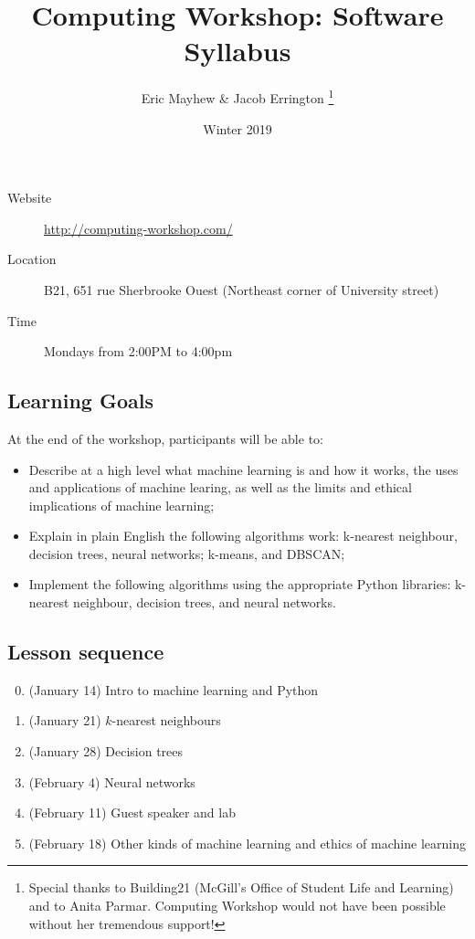 \documentclass[11pt]{article}
\author{%
  Eric Mayhew \& Jacob Errington%
  \footnote{%
    Special thanks to Building21 (McGill's Office of Student Life and Learning)
    and to Anita Parmar.
    Computing Workshop would not have been possible without her tremendous
    support!
  }
}
\title{\vspace{-2em}Computing Workshop: Software Syllabus}
\date{Winter 2019}
\begin{document}
\maketitle

\begin{multicols}{2}
\begin{description}
  \item[Website]
    \url{http://computing-workshop.com/}

  \item[Location]
    B21, 651 rue Sherbrooke Ouest
    (Northeast corner of University street)

  \item[Time]
    Mondays from 2:00PM to 4:00pm
\end{description}

\subsection*{Learning Goals}

At the end of the workshop, participants will be able to:

\begin{itemize}
\item Describe at a high level what machine learning is and how it works, the uses and applications of machine learing,
  as well as the limits and ethical implications of machine learning;
\item Explain in plain English the following algorithms work: k-nearest neighbour, decision trees, neural networks;
  k-means, and DBSCAN;
\item Implement the following algorithms using the appropriate Python libraries: k-nearest neighbour, decision trees, and neural networks.
\end{itemize}

\subsection*{Lesson sequence}

\begin{enumerate}
    \setcounter{enumi}{-1}
  \item (January 14) Intro to machine learning and Python
  \item (January 21) $k$-nearest neighbours
  \item (January 28) Decision trees
  \item (February 4) Neural networks
  \item (February 11) Guest speaker and lab
  \item (February 18) Other kinds of machine learning and ethics of machine learning
\end{enumerate}


\end{multicols}
\end{document}
